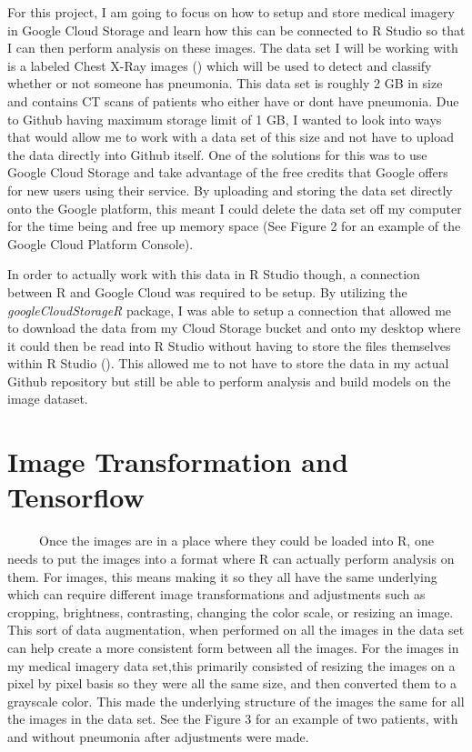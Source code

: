 \documentclass[12pt]{article}
\begin{document}
For this project, I am going to focus on how to setup and store medical
imagery in Google Cloud Storage and learn how this can be connected to R
Studio so that I can then perform analysis on these images. The data set
I will be working with is a labeled Chest X-Ray images (\citet{Medical})
which will be used to detect and classify whether or not someone has
pneumonia. This data set is roughly 2 GB in size and contains CT scans
of patients who either have or dont have pneumonia. Due to Github having
maximum storage limit of 1 GB, I wanted to look into ways that would
allow me to work with a data set of this size and not have to upload the
data directly into Github itself. One of the solutions for this was to
use Google Cloud Storage and take advantage of the free credits that
Google offers for new users using their service. By uploading and
storing the data set directly onto the Google platform, this meant I
could delete the data set off my computer for the time being and free up
memory space (See Figure 2 for an example of the Google Cloud Platform
Console).

In order to actually work with this data in R Studio though, a
connection between R and Google Cloud was required to be setup. By
utilizing the \emph{googleCloudStorageR} package, I was able to setup a
connection that allowed me to download the data from my Cloud Storage
bucket and onto my desktop where it could then be read into R Studio
without having to store the files themselves within R Studio
(\citet{GoogleyR}). This allowed me to not have to store the data in my
actual Github repository but still be able to perform analysis and build
models on the image dataset.

\hypertarget{image-transformation-and-tensorflow}{%
\section{Image Transformation and
Tensorflow}\label{image-transformation-and-tensorflow}}

~~~~~Once the images are in a place where they could be loaded into R,
one needs to put the images into a format where R can actually perform
analysis on them. For images, this means making it so they all have the
same underlying which can require different image transformations and
adjustments such as cropping, brightness, contrasting, changing the
color scale, or resizing an image. This sort of data augmentation, when
performed on all the images in the data set can help create a more
consistent form between all the images. For the images in my medical
imagery data set,this primarily consisted of resizing the images on a
pixel by pixel basis so they were all the same size, and then converted
them to a grayscale color. This made the underlying structure of the
images the same for all the images in the data set. See the Figure 3 for
an example of two patients, with and without pneumonia after adjustments
were made.
\end{document}
